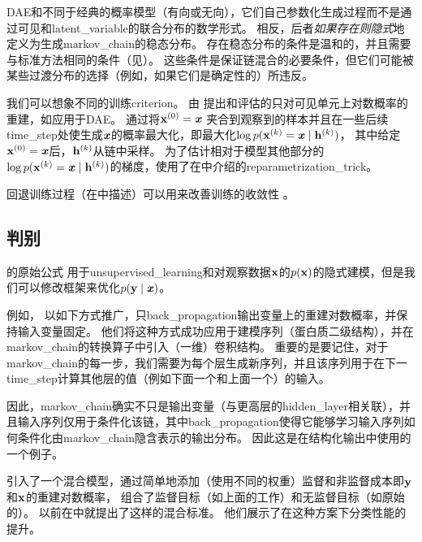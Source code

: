 \gls{DAE}和不同于经典的概率模型（有向或无向），它们自己参数化生成过程而不是通过可见和\gls{latent_variable}的联合分布的数学形式。
相反，后者\emph{如果存在则隐式}地定义为生成\gls{markov_chain}的稳态分布。
存在稳态分布的条件是温和的，并且需要与标准方法相同的条件（见）。
这些条件是保证链混合的必要条件，但它们可能被某些过渡分布的选择（例如，如果它们是确定性的）所违反。


我们可以想象不同的训练\gls{criterion}。
由\citet{Bengio-et-al-ICML-2014} 提出和评估的只对可见单元上对数概率的重建，如应用于\gls{DAE}。
通过将$\mathbf{x}^{(0)} = \boldsymbol{\mathit{x}}$ 夹合到观察到的样本并且在一些后续\gls{time_step}处使生成$\boldsymbol{\mathit{x}}$的概率最大化，即最大化$\log p(\mathbf{x}^{(k)} = \boldsymbol{\mathit{x}}  \mid  \mathbf{h}^{(k)})$， 其中给定$\mathbf{x}^{(0)} = \boldsymbol{\mathit{x}}$后，$\mathbf{h}^{(k)}$从链中采样。
为了估计相对于模型其他部分的$\log p(\mathbf{x}^{(k)} = \boldsymbol{\mathit{x}}  \mid  \mathbf{h}^{(k)})$的梯度，\citet{Bengio-et-al-ICML-2014}使用了在中介绍的\gls{reparametrization_trick}。

回退训练过程（在中描述）可以用来改善训练的收敛性\citep{Bengio-et-al-ICML-2014} 。


\subsection{判别}
\label{sec:discriminant_gsns}
的原始公式\citep{Bengio-et-al-ICML-2014} 用于\gls{unsupervised_learning}和对观察数据$\mathbf{x}$的$p(\mathbf{x})$的隐式建模，但是我们可以修改框架来优化$p(\mathbf{y}  \mid  \boldsymbol{\mathit{x}})$。


例如， \citet{Zhou+Troyanskaya-ICML2014} 以如下方式推广，只\gls{back_propagation}输出变量上的重建对数概率，并保持输入变量固定。
他们将这种方式成功应用于建模序列（蛋白质二级结构），并在\gls{markov_chain}的转换算子中引入（一维）卷积结构。
重要的是要记住，对于\gls{markov_chain}的每一步，我们需要为每个层生成新序列，并且该序列用于在下一\gls{time_step}计算其他层的值（例如下面一个和上面一个）的输入。

因此，\gls{markov_chain}确实不只是输出变量（与更高层的\gls{hidden_layer}相关联），并且输入序列仅用于条件化该链，其中\gls{back_propagation}使得它能够学习输入序列如何条件化由\gls{markov_chain}隐含表示的输出分布。
因此这是在结构化输出中使用的一个例子。

\citet{Zohrer+Pernkopf-NIPS2014-small} 引入了一个混合模型，通过简单地添加（使用不同的权重）监督和非监督成本即$\mathbf{y}$和$\mathbf{x}$的重建对数概率， 组合了监督目标（如上面的工作）和无监督目标（如原始的）。
\citet{Larochelle+Bengio-2008-small}以前在中就提出了这样的混合标准。
他们展示了在这种方案下分类性能的提升。

